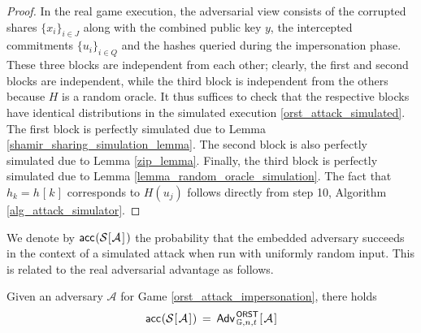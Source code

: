 \documentclass{iacrtrans}
\begin{document}
\begin{proof}
In the real game execution, the adversarial view consists of
the corrupted shares $\{x_i\}_{i \in J}$
along with the combined public key $y$,
the intercepted commitments $\{u_i\}_{i \in Q}$
and the hashes queried during the impersonation phase.
These three blocks are independent
from each other; clearly, the first and second blocks are
independent, while the third block is independent from the others
because $H$ is a random oracle.
It thus suffices to check that the respective blocks
have identical distributions in the simulated execution
\eqref{orst_attack_simulated}.
The first block is perfectly simulated
due to Lemma \ref{shamir_sharing_simulation_lemma}.
The second block is also perfectly simulated
due to Lemma \ref{zip_lemma}.
Finally, the third block is perfectly simulated
due to Lemma \ref{lemma_random_oracle_simulation}.
The fact that
$h_k = h\hspace{1pt}[\hspace{1pt}k\hspace{1pt}]$
corresponds to $H(u_j)$
follows directly from step 10, Algorithm \ref{alg_attack_simulator}.
\vspace{5pt}
\end{proof}

\noindent
We denote by
$
\mathsf{acc}\hspace{0.5pt}(
	\mathcal{S}
	\hspace{0.5pt}
	[
		\hspace{0.5pt}
		\mathcal{A}
		\hspace{1pt}
	]
	\hspace{1pt})
$
the probability that the embedded adversary
succeeds in the context of a simulated attack
when run with uniformly random input.
This is related to the real adversarial advantage
as follows.

\begin{cor}\label{equality_intermediate}
Given an adversary $\mathcal{A}$
for Game \textup{\ref{orst_attack_impersonation}},
there holds
\vspace{5pt}
\begin{equation}
	\mathsf{acc}\hspace{0.5pt}(
		\mathcal{S}
		\hspace{0.5pt}[
			\hspace{1pt}
			\mathcal{A}
			\hspace{1pt}
		]\hspace{0.5pt}
	)
	\hspace{2pt}
	=
	\hspace{2pt}
	\mathsf{Adv}
		_{\hspace{1pt}\mathbb{G}, n, t}
		^{\hspace{1pt}\mathsf{ORST}}\hspace{0.5pt}
		[
			\hspace{1pt}
			\mathcal{A}
			\hspace{1pt}
		]
\vspace{5pt}
\end{equation}
\end{cor}
\end{document}
